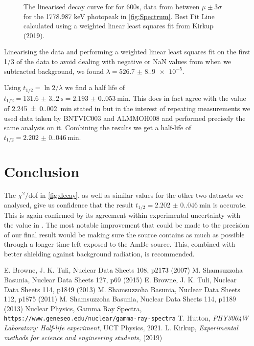 \documentclass[11pt]{article}
\numberwithin{equation}{section}
\numberwithin{figure}{section}
\numberwithin{table}{section}
\begin{document}
\begin{wrapfigure}[18]{r}{0.5\textwidth}
    \begin{center}
        \caption{The linearised decay curve for  for 600s, data from between $\mu\pm3\sigma$ for the 1778.987 keV photopeak in \autoref{fig:Spectrum}. Best Fit Line calculated using a weighted linear least squares fit from Kirkup (2019).}
        \label{fig:decay}
    \end{center}
\end{wrapfigure}
\par Linearising the data and performing a weighted linear least squares fit \cite{kirkup} on the first 1/3 of the data to avoid dealing with negative or NaN values from when we subtracted background, we found $\lambda=\num{526.7(8.9)e-5}$. 
\par Using $t_{1/2}=\ln2/\lambda$ \cite{manual} we find a half life of $t_{1/2}=\SI{131.6(3.2)}{\second}=\SI{2.193(0.053)}{\minute}$. This does in fact agree with the value of \SI{2.245(0.002)}{\minute} stated in \cite{28Al} but in the interest of repeating measurements we used data taken by BNTVIC003 and ALMMOH008 and performed precisely the same analysis on it. Combining the results we get a half-life of $t_{1/2}=\SI{2.202(0.046)}{\minute}$.

\section{Conclusion}\label{sec:Conclusion}
The $\chi^2/$dof in \autoref{fig:decay}, as well as similar values for the other two datasets we analysed, give us confidence that the result $t_{1/2}=\SI{2.202(0.046)}{\minute}$ is accurate. This is again confirmed by its agreement within experimental uncertainty with the value in \cite{28Al}. The most notable improvement that could be made to the precision of our final result would be making sure the source contains as much  as possible through a longer time left exposed to the AmBe source. This, combined with better shielding against background radiation, is recommended.


\begin{thebibliography}{9}
    E. Browne, J. K. Tuli, Nuclear Data Sheets 108, p2173 (2007)
    M. Shamsuzzoha Basunia, Nuclear Data Sheets 127, p69 (2015)
    E. Browne, J. K. Tuli, Nuclear Data Sheets 114, p1849 (2013)
    M. Shamsuzzoha Basunia, Nuclear Data Sheets 112, p1875 (2011)
    M. Shamsuzzoha Basunia, Nuclear Data Sheets 114, p1189 (2013)
    Nuclear Physics, Gamma Ray Spectra, 
    \texttt{https://www.geneseo.edu/nuclear/gamma-ray-spectra}
    T. Hutton, \textit{PHY3004W Laboratory: Half-life experiment}, UCT Physics, 2021.
    L. Kirkup, \textit{Experimental methods for science and engineering students}, (2019)
    
\end{thebibliography}
\end{document}
